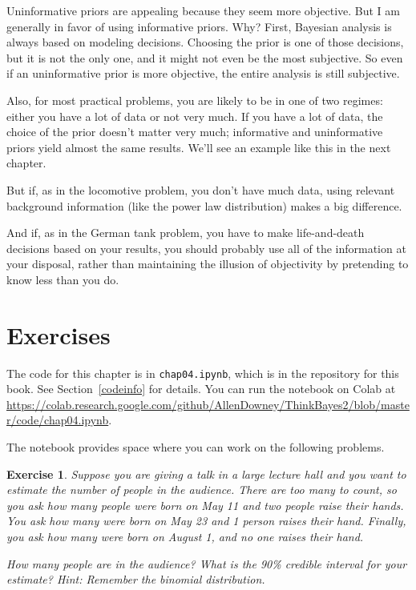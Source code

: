 \documentclass[12pt]{book}
\theoremstyle{exercise}
\newtheorem{exercise}{Exercise}[chapter]
\newcommand{\py}[1]{{\tt #1}}%
\begin{document}
Uninformative priors are appealing because they seem more
objective.  But I am generally in favor of using informative priors.
Why?  First, Bayesian analysis is always based on
modeling decisions.  Choosing the prior is one of those decisions, but
it is not the only one, and it might not even be the most subjective.
So even if an uninformative prior is more objective, the entire analysis
is still subjective.


Also, for most practical problems, you are likely to be in one of two
regimes: either you have a lot of data or not very much.  If you have
a lot of data, the choice of the prior doesn't matter very much;
informative and uninformative priors yield almost the same results.
We'll see an example like this in the next chapter.

But if, as in the locomotive problem, you don't have much data,
using relevant background information (like the power law distribution)
makes a big difference.

And if, as in the German tank problem, you have to make life-and-death
decisions based on your results, you should probably use all of the
information at your disposal, rather than maintaining the illusion of
objectivity by pretending to know less than you do.


\section{Exercises}

The code for this chapter is in \py{chap04.ipynb}, which is in the repository for this book.  See Section~\ref{codeinfo} for details.
You can run the notebook on Colab at \url{https://colab.research.google.com/github/AllenDowney/ThinkBayes2/blob/master/code/chap04.ipynb}.

The notebook provides space where you can work on the following problems.


\begin{exercise}
Suppose you are giving a talk in a large lecture hall and you want to estimate the number of people in the audience.  There are too many to count, so you ask how many people were born on May 11 and two people raise their hands.  You ask how many were born on May 23 and 1 person raises their hand.  Finally, you ask how many were born on August 1, and no one raises their hand.

How many people are in the audience?  What is the 90\% credible interval for your estimate?  Hint: Remember the binomial distribution.
\end{exercise}
\end{document}
